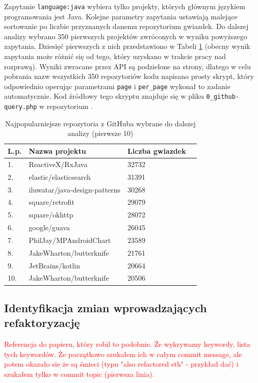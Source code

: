 \documentclass[12pt]{report}
\begin{document}
Zapytanie \texttt{language:java} wybiera tylko projekty, których głównym językiem programowania jest Java. Kolejne parametry zapytania ustawiają malejące sortowanie po liczbie przyznanych danemu repozytorium gwiazdek. Do dalszej analizy wybrano 350 pierwszych projektów zwróconych w wyniku powyższego zapytania. Dziesięć pierwszych z nich przedstawiono w Tabeli \ref{tbl:github-top-10} (obecny wynik zapytania może różnić się od tego, który uzyskano w trakcie pracy nad rozprawą). Wyniki zwracane przez API są podzielone na strony, dlatego w celu pobrania nazw wszystkich 350 repozytoriów kodu napisano prosty skrypt, który odpowiednio operując parametrami \texttt{page} i \texttt{per\_page} wykonał to zadanie automatycznie. Kod źródłowy tego skryptu znajduje się w pliku \texttt{0\_github-query.php} w repozytorium \cite{fracz:refactor-extractor}.

\begin{table}[t]
\caption{Najpopularniejsze repozytoria z GitHuba wybrane do dalszej analizy (pierwsze 10)}
\label{tbl:github-top-10}
\begin{tabular}{|l|l|l|l|}
  \hline 
  \textbf{L.p.} & \textbf{Nazwa projektu} & \textbf{Liczba gwiazdek} \\ \hline
  1. & ReactiveX/RxJava & 32732 \\ \hline
  2. & elastic/elasticsearch & 31391 \\ \hline
  3. & iluwatar/java-design-patterns & 30268 \\ \hline
  4. & square/retrofit & 29079 \\ \hline
  5. & square/okhttp & 28072 \\ \hline
  6. & google/guava & 26045 \\ \hline
  7. & PhilJay/MPAndroidChart & 23589 \\ \hline
  8. & JakeWharton/butterknife & 21761 \\ \hline
  9. & JetBrains/kotlin & 20664 \\ \hline
  10. & JakeWharton/butterknife & 20506 \\ \hline
\end{tabular} 
\end{table}

\subsection{Identyfikacja zmian wprowadzających refaktoryzację}
\label{sec:impl:identification-commits}
\textcolor{red}{Referencja do papieru, który robil to podobnie. Że wykrywamy keywordy, lista tych keywordów. Że początkowo szukałem ich w całym commit message, ale potem okazało sie że są śmieci (typu "also refactored sth" - przykład dać) i szukałem tylko w commit topic (pierwsza linia).}
\end{document}
